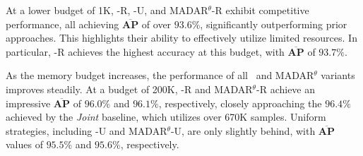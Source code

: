 At a lower budget of 1K, \system-R, \system-U, and MADAR$^\theta$-R exhibit competitive performance, all achieving $\mathbf{\overline{AP}}$ of over $93.6$\%, significantly outperforming prior approaches. This highlights their ability to effectively utilize limited resources. In particular, \system-R achieves the highest accuracy at this budget, with $\mathbf{\overline{AP}}$ of $93.7\%$.

As the memory budget increases, the performance of all \system\ and MADAR$^\theta$ variants improves steadily. At a budget of 200K, \system-R and MADAR$^\theta$-R achieve an impressive $\mathbf{\overline{AP}}$ of $96.0\%$ and $96.1\%$, respectively, closely approaching the $96.4\%$ achieved by the \textit{Joint} baseline, which utilizes over 670K samples. Uniform strategies, including \system-U and MADAR$^\theta$-U, are only slightly behind, with $\mathbf{\overline{AP}}$ values of $95.5\%$ and $95.6\%$, respectively.






